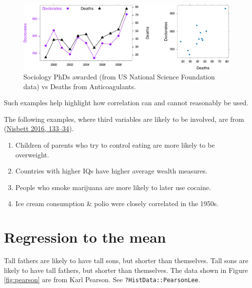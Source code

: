 \documentclass[
  10pt,
  b5paper]{book}
\providecommand{\tightlist}{%
  \setlength{\itemsep}{0pt}\setlength{\parskip}{0pt}}
\begin{document}
\begin{figure}

{\centering \includegraphics[width=0.75\linewidth]{07-regress_files/figure-latex/socAnti-1} 

}

\caption{Sociology PhDs awarded (from US National Science 
Foundation data) vs Deaths from Anticoagulants.
}\label{fig:socAnti}
\end{figure}

Such examples help highlight how correlation can and
cannot reasonably be used.

The following examples, where third variables are likely to
be involved, are from (\protect\hyperlink{ref-nisbett}{Nisbett 2016, 133--34}).

\begin{enumerate}
\def\labelenumi{\arabic{enumi}.}
\tightlist
\item
  Children of parents who try to control eating are more likely
  to be overweight.
\item
  Countries with higher IQs have higher average wealth measures.
\item
  People who smoke marijuana are more likely to later use cocaine.
\item
  Ice cream consumption \& polio were closely correlated in the 1950s.
\end{enumerate}

\hypertarget{regression-to-the-mean}{%
\section{Regression to the mean}\label{regression-to-the-mean}}

\enlargethispage{11pt}

Tall fathers are likely to have tall sons, but shorter than themselves.
Tall sons are likely to have tall fathers, but shorter than themselves.
The data shown in Figure \ref{fig:pearson} are from Karl Pearson.
See \texttt{?HistData::PearsonLee}.
\end{document}
